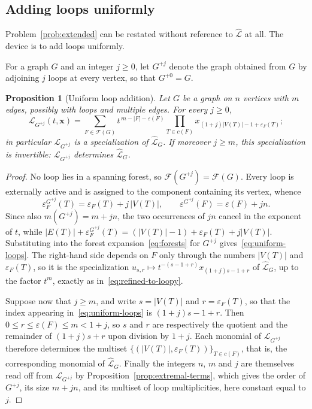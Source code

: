 \documentclass[11pt]{article}
\theoremstyle{plain}
\newtheorem{proposition}[theorem]{Proposition}
\theoremstyle{definition}
\renewcommand{\mathcal}{\mathscr}
\newcommand{\LL}{\mathcal{L}}    %
\newcommand{\cF}{\mathcal{F}}    %
\newcommand{\bx}{\mathbf{x}}
\newcommand{\eps}{\varepsilon}
\numberwithin{equation}{section}
\begin{document}
\subsection{Adding loops uniformly}\label{subsec:uniform-loops}

Problem~\ref{prob:extended} can be restated without reference to
$\widehat{\LL}$ at all.  The device is to add loops uniformly.

For a graph $G$ and an integer $j\ge 0$, let $G^{+j}$ denote the graph
obtained from $G$ by adjoining $j$ loops at every vertex, so that
$G^{+0}=G$.

\begin{proposition}[Uniform loop addition]\label{prop:uniform-loops}
Let $G$ be a graph on $n$ vertices with $m$ edges, possibly with loops and
multiple edges.  For every $j\ge 0$,
\begin{equation}\label{eq:uniform-loops}
   \LL_{G^{+j}}(t,\bx)
   =
   \sum_{F\in\cF(G)}
      t^{\,m-|F|-\eps(F)}
      \prod_{T\in c(F)}
         x_{(1+j)|V(T)|-1+\eps_F(T)} ;
\end{equation}
in particular $\LL_{G^{+j}}$ is a specialization of $\widehat{\LL}_G$.  If
moreover $j\ge m$, this specialization is invertible: $\LL_{G^{+j}}$
determines $\widehat{\LL}_G$.
\end{proposition}

\begin{proof}
No loop lies in a spanning forest, so $\cF(G^{+j})=\cF(G)$.  Every loop is
externally active and is assigned to the component containing its vertex,
whence
\[
   \eps^{G^{+j}}_F(T)=\eps_F(T)+j\,|V(T)|,
   \qquad
   \eps^{G^{+j}}(F)=\eps(F)+jn .
\]
Since also $m(G^{+j})=m+jn$, the two occurrences of $jn$ cancel in the
exponent of $t$, while
$|E(T)|+\eps^{G^{+j}}_F(T)=(|V(T)|-1)+\eps_F(T)+j|V(T)|$.
Substituting into the forest expansion~\eqref{eq:forests} for $G^{+j}$
gives~\eqref{eq:uniform-loops}.  The right-hand side depends on $F$ only
through the numbers $|V(T)|$ and $\eps_F(T)$, so it is the
specialization $u_{s,r}\mapsto t^{-(s-1+r)}x_{(1+j)s-1+r}$ of
$\widehat{\LL}_G$, up to the factor $t^{m}$, exactly as
in~\eqref{eq:refined-to-loopy}.

Suppose now that $j\ge m$, and write $s=|V(T)|$ and $r=\eps_F(T)$, so
that the index appearing in~\eqref{eq:uniform-loops} is $(1+j)s-1+r$.  Then
$0\le r\le\eps(F)\le m<1+j$, so $s$ and $r$ are respectively the
quotient and the remainder of $(1+j)s+r$ upon division by $1+j$.  Each
monomial of $\LL_{G^{+j}}$ therefore determines the multiset
$\bigl\{(|V(T)|,\eps_F(T))\bigr\}_{T\in c(F)}$, that is, the
corresponding monomial of $\widehat{\LL}_G$.  Finally the integers $n$, $m$
and $j$ are themselves read off from $\LL_{G^{+j}}$ by
Proposition~\ref{prop:extremal-terms}, which gives the order of $G^{+j}$,
its size $m+jn$, and its multiset of loop multiplicities, here constant
equal to $j$.
\end{proof}
\end{document}
